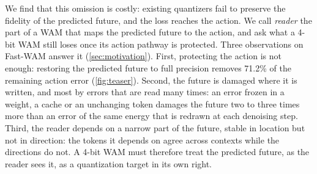 We find that this omission is costly: existing quantizers fail to preserve the fidelity of the predicted future, and the loss reaches the action.
We call \emph{reader} the part of a WAM that maps the predicted future to the action, and ask what a 4-bit WAM still loses once its action pathway is protected.
Three observations on Fast-WAM answer it (\cref{sec:motivation}).
First, protecting the action is not enough: restoring the predicted future to full precision removes 71.2\% of the remaining action error (\cref{fig:teaser}).
Second, the future is damaged where it is written, and most by errors that are read many times: an error frozen in a weight, a cache or an unchanging token damages the future two to three times more than an error of the same energy that is redrawn at each denoising step.
Third, the reader depends on a narrow part of the future, stable in location but not in direction: the tokens it depends on agree across contexts while the directions do not.
A 4-bit WAM must therefore treat the predicted future, as the reader sees it, as a quantization target in its own right.

